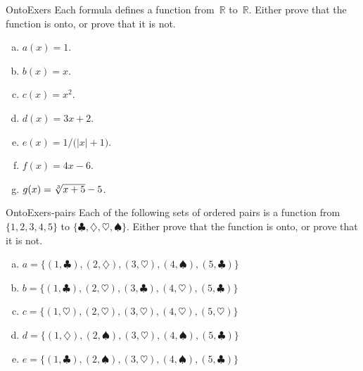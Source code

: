   
\begin{exercise}{OntoExers} 
Each formula defines a function from~$\mathbb{R}$ to~$\mathbb{R}$. Either prove that the function is onto, or prove that it is not.
\begin{multicols}{2}
\begin{enumerate}[(a)]
\item \label{OntoExers-formula-a(x)}
 $a(x) = 1$.
\item \label{OntoExers-formula-b(x)}
 $b(x) = x$.
\item \label{OntoExers-formula-c(x)}
 $c(x) = x^2$.
\item \label{OntoExers-formula-d(x)}
 $d(x) = 3x + 2$.
\item \label{OntoExers-formula-e(x)}
 $e(x) = 1/ \bigl( |x| + 1 \bigr)$.
\item \label{OntoExers-formula-f(x)}
 $f(x) = 4x - 6$.
\item \label{OntoExers-formula-g(x)}
 $g(x) = \root 3 \of {x+5} - 5$.
\end{enumerate}
\end{multicols}
\end{exercise}

\begin{exercise}{OntoExers-pairs}
Each of the following sets of ordered pairs is a function from $\{1,2,3,4,5\}$ to $\{\clubsuit,\diamondsuit,\heartsuit,\spadesuit\}$. Either prove that the function is onto, or prove that it is not.
\begin{enumerate}[(a)]
\item \label{OntoExers-pairs-a}
$a = \{ (1,\clubsuit), (2,\diamondsuit), (3,\heartsuit), (4,\spadesuit), (5,\clubsuit) \}$
\item \label{OntoExers-pairs-b}
$b = \{ (1,\clubsuit), (2,\heartsuit), (3,\clubsuit), (4,\heartsuit), (5,\clubsuit) \}$
\item \label{OntoExers-pairs-c}
$c = \{ (1,\heartsuit), (2,\heartsuit), (3, \heartsuit), (4,\heartsuit), (5, \heartsuit) \}$
\item \label{OntoExers-pairs-d}
$d = \{ (1,\diamondsuit), (2,\spadesuit), (3, \heartsuit), (4,\spadesuit), (5, \clubsuit) \}$
\item \label{OntoExers-pairs-e}
$e = \{ (1,\clubsuit), (2,\spadesuit), (3, \heartsuit), (4,\spadesuit), (5, \clubsuit) \}$
\end{enumerate}
\end{exercise}


